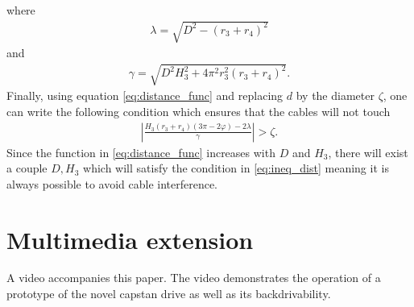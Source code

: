 \documentclass[10pt,cleanfoot]{asme2ej}
\newcommand\abs[1]{\left|#1\right|}
\begin{document}
where
\begin{align}
\lambda = \sqrt{D^2-(r_3+r_4)^2}
\end{align}
and
\begin{align}
\gamma = \sqrt{D^2H_3^2+4\pi^2r_3^2(r_3+r_4)^2}.
\end{align}
Finally, using equation \eqref{eq:distance_func} and replacing $d$ by the diameter $\zeta$, one can write the following condition which ensures that the cables will not touch
\begin{align}
\abs{\frac{H_3(r_3+r_4)(3\pi-2\varphi)-2\lambda}{\gamma}} > \zeta.
\label{eq:ineq_dist}
\end{align}
Since the function in \eqref{eq:distance_func} increases with $D$ and $H_3$, there will exist a couple $D,H_3$ which will satisfy the condition in \eqref{eq:ineq_dist} meaning it is always possible to avoid cable interference.
\section{Multimedia extension}
A video accompanies this paper. The video demonstrates the operation of a prototype of the novel capstan drive as well as its backdrivability.
\end{document}
